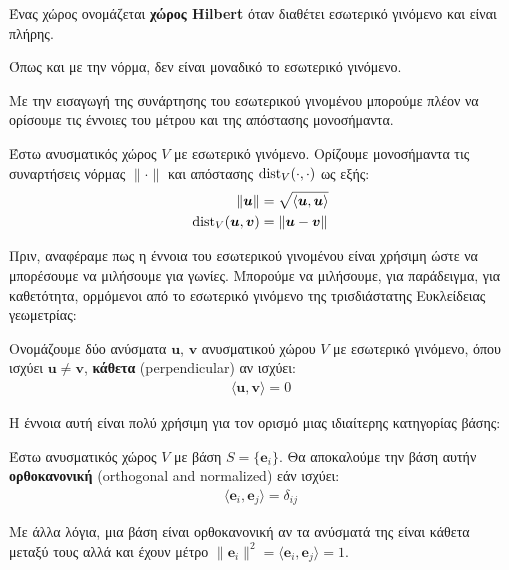 \documentclass[main.tex]{subfiles}
\begin{document}
	\begin{definition}
		Ένας χώρος ονομάζεται \textbf{χώρος Hilbert} όταν διαθέτει εσωτερικό γινόμενο και είναι πλήρης.
	\end{definition}

	Όπως και με την νόρμα, δεν είναι μοναδικό το εσωτερικό γινόμενο.
	
	Με την εισαγωγή της συνάρτησης του εσωτερικού γινομένου μπορούμε πλέον να ορίσουμε τις έννοιες του μέτρου και της απόστασης μονοσήμαντα.
	\begin{definition}
		Έστω ανυσματικός χώρος $V$ με εσωτερικό γινόμενο. Ορίζουμε μονοσήμαντα τις συναρτήσεις νόρμας $\|\cdot\|$ και απόστασης $\operatorname{dist}_V(\cdot,\cdot)$ ως εξής:
		\begin{align*}
			\|\boldsymbol{u}\| &= \sqrt{\langle\boldsymbol{u},\boldsymbol{u}\rangle} \\
			\operatorname{dist}_V(\boldsymbol{u},\boldsymbol{v}) &= \|\boldsymbol{u} - \boldsymbol{v}\|
		\end{align*}
	\end{definition}

	Πριν, αναφέραμε πως η έννοια του εσωτερικού γινομένου είναι χρήσιμη ώστε να μπορέσουμε να μιλήσουμε για γωνίες. Μπορούμε να μιλήσουμε, για παράδειγμα, για καθετότητα, ορμόμενοι από το εσωτερικό γινόμενο της τρισδιάστατης Ευκλείδειας γεωμετρίας:
	\begin{definition}
		Ονομάζουμε δύο ανύσματα $\boldsymbol{u}$, $\boldsymbol{v}$ ανυσματικού χώρου $V$ με εσωτερικό γινόμενο, όπου ισχύει $\boldsymbol{u}\neq\boldsymbol{v}$, \textbf{κάθετα} (perpendicular) αν ισχύει:
		\begin{align*}
			\langle\boldsymbol{u},\boldsymbol{v}\rangle = 0
		\end{align*}
	\end{definition}

	Η έννοια αυτή είναι πολύ χρήσιμη για τον ορισμό μιας ιδιαίτερης κατηγορίας βάσης:
	\begin{definition}
		Έστω ανυσματικός χώρος $V$ με βάση ${S = \{\boldsymbol{e}_i\}}$. Θα αποκαλούμε την βάση αυτήν \textbf{ορθοκανονική} (orthogonal and normalized) εάν ισχύει:
		\begin{align*}
			\langle\boldsymbol{e}_i,\boldsymbol{e}_j\rangle = \delta_{ij}
		\end{align*}
	\end{definition}
	Με άλλα λόγια, μια βάση είναι ορθοκανονική αν τα ανύσματά της είναι κάθετα μεταξύ τους αλλά και έχουν μέτρο $\|\boldsymbol{e}_i\|^2 = \langle\boldsymbol{e}_i,\boldsymbol{e}_j\rangle = 1$.
	
\end{document}
